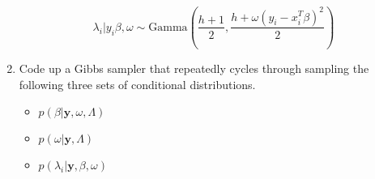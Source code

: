 \documentclass[10pt]{article}
\newcommand{\by}{\mathbf{y}}
\begin{document}
\begin{enumerate}[label=(\Alph*)]
      $$\lambda_i | y_i \beta, \omega \sim \text{Gamma}\left(\frac{h+1}{2}, \frac{h + \omega(y_i - x_i^T \beta)^2}{2} \right)$$

    \item Code up a Gibbs sampler that repeatedly cycles through sampling the following three sets of conditional distributions.

    \begin{itemize}
      \item $p(\beta | \by, \omega, \Lambda)$
      \item $p(\omega | \by, \Lambda)$
      \item $p(\lambda_i | \by, \beta, \omega)$
    \end{itemize}

    \end{enumerate}
\end{document}

